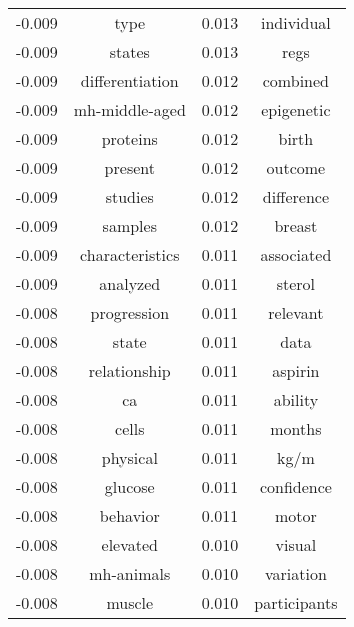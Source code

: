 \documentclass[paper=a4, fontsize=11pt]{scrartcl} %
\numberwithin{equation}{section} %
\numberwithin{figure}{section} %
\numberwithin{table}{section} %
\begin{document}
\begin{table}
\begin{tabular}{l c | l c}
-0.009 & type & 0.013 & individual \\
-0.009 & states & 0.013 & regs \\
-0.009 & differentiation & 0.012 & combined \\
-0.009 & mh-middle-aged & 0.012 & epigenetic \\
-0.009 & proteins & 0.012 & birth \\
-0.009 & present & 0.012 & outcome \\
-0.009 & studies & 0.012 & difference \\
-0.009 & samples & 0.012 & breast \\
-0.009 & characteristics & 0.011 & associated \\
-0.009 & analyzed & 0.011 & sterol \\
-0.008 & progression & 0.011 & relevant \\
-0.008 & state & 0.011 & data \\
-0.008 & relationship & 0.011 & aspirin \\
-0.008 & ca & 0.011 & ability \\
-0.008 & cells & 0.011 & months \\
-0.008 & physical & 0.011 & kg/m \\
-0.008 & glucose & 0.011 & confidence \\
-0.008 & behavior & 0.011 & motor \\
-0.008 & elevated & 0.010 & visual \\
-0.008 & mh-animals & 0.010 & variation \\
-0.008 & muscle & 0.010 & participants \\
\end{tabular}
\end{table}
\end{document}
